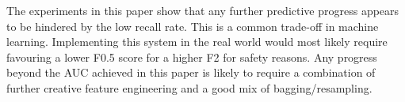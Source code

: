 \documentclass[journal]{IEEEtran}
\begin{document}
The experiments in this paper show that any further predictive progress appears to be hindered by the low recall rate. This is a common trade-off in machine learning. Implementing this system in the real world would most likely require favouring a lower F0.5 score for a higher F2 for safety reasons. Any progress beyond the AUC achieved in this paper is likely to require a combination of further creative feature engineering and a good mix of bagging/resampling.





%
%



%
%
\end{document}
